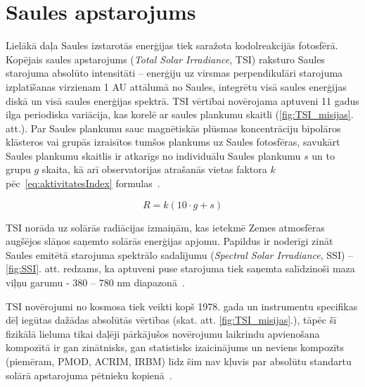 \section{Saules apstarojums}

Lielākā daļa Saules izstarotās enerģijas tiek saražota kodolreakcijās fotosfērā. 
Kopējais saules apstarojums (\textit{Total Solar Irradiance}, TSI) raksturo Saules starojuma absolūto intensitāti -- enerģiju uz virsmas perpendikulāri starojuma izplatīšanas virzienam 1 AU attālumā no Saules, integrētu visā saules enerģijas diskā un visā saules enerģijas spektrā. TSI vērtībai novērojama aptuveni 11 gadus ilga periodiska variācija, kas korelē ar saules plankumu skaitli (\ref{fig:TSI_misijas}. att.). Par Saules plankumu sauc magnētiskās plūsmas koncentrāciju bipolāros klāsteros vai grupās izraisītos tumšos plankums uz Saules fotosfēras, savukārt Saules plankumu skaitlis ir atkarīgs no individuālu Saules plankumu $s$ un to grupu $g$ skaita, kā arī observatorijas atrašanās vietas faktora $k$
pēc~\ref{eq:aktivitatesIndex} formulas~\cite{ThermalProcesses}.

\begin{equation}
\label{eq:aktivitatesIndex}
R = k(10 \cdot g + s)
\end{equation}

TSI norāda uz solārās radiācijas izmaiņām, kas ietekmē Zemes atmosfēras augšējos slāņos saņemto solārās enerģijas apjomu. Papildus ir noderīgi zināt Saules emitētā starojuma spektrālo sadalījumu (\textit{Spectral Solar Irradiance}, SSI) -- \ref{fig:SSI}. att. redzams, ka aptuveni puse starojuma tiek saņemta salīdzinoši maza viļņu garumu - 380 -- 780 nm diapazonā~\cite{ThermalProcesses}.

TSI novērojumi no kosmosa tiek veikti kopš 1978. gada un instrumentu specifikas dēļ iegūtas dažādas absolūtās vērtības (skat. att. \ref{fig:TSI_misijas}.), tāpēc šī fizikālā lieluma tikai daļēji pārkājušos novērojumu laikrindu apvienošana kompozītā ir gan zinātnisks, gan statistisks izaicinājums un neviens kompozīts (piemēram, PMOD, ACRIM, IRBM) līdz šim nav kļuvis par absolūtu standartu solārā apstarojuma pētnieku kopienā~\cite{Frohlich2012}.

